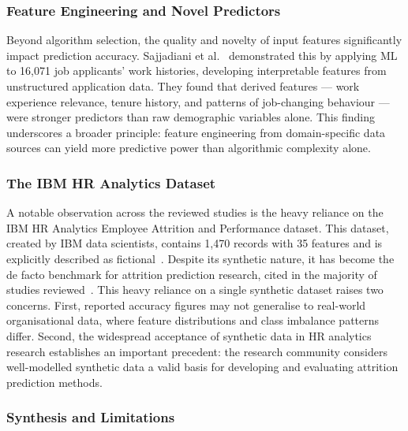\documentclass[12pt,a4paper]{article}
\begin{document}
\subsubsection{Feature Engineering and Novel Predictors}

Beyond algorithm selection, the quality and novelty of input features significantly impact prediction accuracy. Sajjadiani et al.~\cite{sajjadiani2019ml} demonstrated this by applying ML to 16,071 job applicants' work histories, developing interpretable features from unstructured application data. They found that derived features --- work experience relevance, tenure history, and patterns of job-changing behaviour --- were stronger predictors than raw demographic variables alone. This finding underscores a broader principle: feature engineering from domain-specific data sources can yield more predictive power than algorithmic complexity alone.

\subsubsection{The IBM HR Analytics Dataset}

A notable observation across the reviewed studies is the heavy reliance on the IBM HR Analytics Employee Attrition and Performance dataset. This dataset, created by IBM data scientists, contains 1,470 records with 35 features and is explicitly described as fictional~\cite{ibm_hr_dataset}. Despite its synthetic nature, it has become the de facto benchmark for attrition prediction research, cited in the majority of studies reviewed~\cite{fallucchi2020attrition, jain2022ensemble, yadav2018attrition, osman2025attrition}. This heavy reliance on a single synthetic dataset raises two concerns. First, reported accuracy figures may not generalise to real-world organisational data, where feature distributions and class imbalance patterns differ. Second, the widespread acceptance of synthetic data in HR analytics research establishes an important precedent: the research community considers well-modelled synthetic data a valid basis for developing and evaluating attrition prediction methods.

\subsubsection{Synthesis and Limitations}
\end{document}
